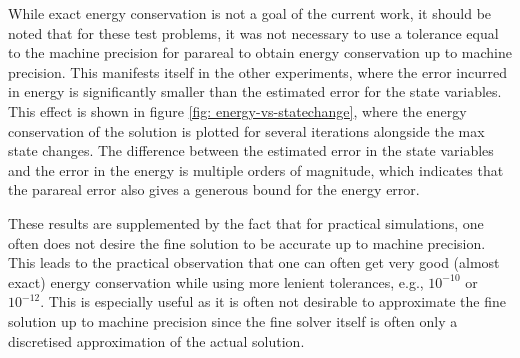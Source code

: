 While exact energy conservation is not a goal of the current work, it should be noted that for these test problems, it was not necessary to use a tolerance equal to the machine precision for parareal to obtain energy conservation up to machine precision. This manifests itself in the other experiments, where the error incurred in energy is significantly smaller than the estimated error for the state variables. This effect is shown in figure \ref{fig: energy-vs-statechange}, where the energy conservation of the solution is plotted for several iterations alongside the max state changes. The difference between the estimated error in the state variables and the error in the energy is multiple orders of magnitude, which indicates that the parareal error also gives a generous bound for the energy error.

These results are supplemented by the fact that for practical simulations, one often does not desire the fine solution to be accurate up to machine precision. This leads to the practical observation that one can often get very good (almost exact) energy conservation while using more lenient tolerances, e.g., $10^{-10}$ or $10^{-12}$. This is especially useful as it is often not desirable to approximate the fine solution up to machine precision since the fine solver itself is often only a discretised approximation of the actual solution.

